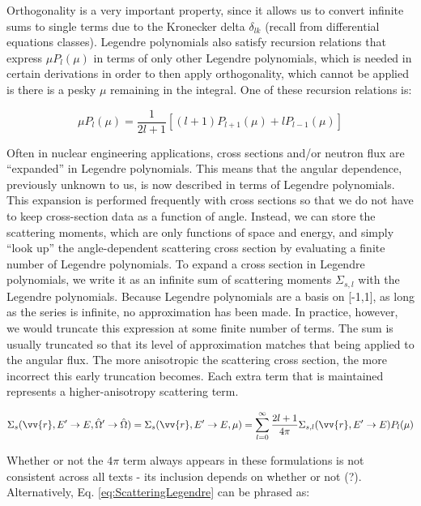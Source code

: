 \documentclass[10pt]{article}
\begin{document}
\begin{flushleft}
Orthogonality is a very important property, since it allows us to convert infinite sums to single terms due to the Kronecker delta \(\delta_{lk}\) (recall from differential equations classes). Legendre polynomials also satisfy recursion relations that express \(\mu P_l(\mu)\) in terms of only other Legendre polynomials, which is needed in certain derivations in order to then apply orthogonality, which cannot be applied is there is a pesky \(\mu\) remaining in the integral. One of these recursion relations is:

\begin{equation}
\label{eqn:LegendrePolynomialRecursion1}
\mu P_l(\mu) = \frac{1}{2l+1} \left\lbrack(l+1)P_{l+1}(\mu) + l P_{l-1}(\mu)\right\rbrack
\end{equation}

Often in nuclear engineering applications, cross sections and/or neutron flux are ``expanded'' in Legendre polynomials. This means that the angular dependence, previously unknown to us, is now described in terms of Legendre polynomials. This expansion is performed frequently with cross sections so that we do not have to keep cross-section data as a function of angle. Instead, we can store the scattering moments, which are only functions of space and energy, and simply ``look up'' the angle-dependent scattering cross section by evaluating a finite number of Legendre polynomials. To expand a cross section in Legendre polynomials, we write it as an infinite sum of scattering moments \(\Sigma_{s,l}\) with the Legendre polynomials. Because Legendre polynomials are a basis on [-1,1], as long as the series is infinite, no approximation has been made. In practice, however, we would truncate this expression at some finite number of terms. The sum is usually truncated so that its level of approximation matches that being applied to the angular flux. The more anisotropic the scattering cross section, the more incorrect this early truncation becomes. Each extra term that is maintained represents a higher-anisotropy scattering term.

\begin{equation}
\label{eq:ScatteringLegendre}
\Sigma_s(\vv{r}, E'\rightarrow E, \hat{\Omega}'\rightarrow\hat{\Omega}) = \Sigma_s(\vv{r}, E'\rightarrow E, \mu) = \sum_{l=0}^{\infty} \frac{2l+1}{4\pi} \Sigma_{s,l}(\vv{r}, E'\rightarrow E)P_l(\mu)
\end{equation}

Whether or not the \(4\pi\) term always appears in these formulations is not consistent across all texts - its inclusion depends on whether or not (?). Alternatively, Eq. \eqref{eq:ScatteringLegendre} can be phrased as:


\end{flushleft}
\end{document}
